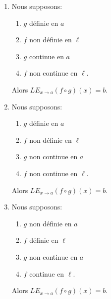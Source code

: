 \begin{theorem}
\begin{enumerate}
\begin{multicols}{2}
\begin{enumerate}
				      \item \( g\) non continue en \( a\)
				      \item \( f\) non continue en \( \ell\).
			      \end{enumerate}
		      \end{multicols}
		      Alors nous ne disons rien.
		\item   \label{ITEMooANFQooWVrfTd}      %
		      Nous supposons:
		      \begin{multicols}{2}
			      \begin{enumerate}
				      \item \( g\) définie en \( a\)
				      \item \( f\) non définie en \( \ell\)
				      \item \( g\) continue en \( a\)
				      \item \( f\) non continue en \( \ell\).
			      \end{enumerate}
		      \end{multicols}
		      Alors \( {LE}_{x\to a}(f\circ g)(x)=b\).
		\item   \label{ITEMooDJBHooSlqpOO}      %
		      Nous supposons:
		      \begin{multicols}{2}
			      \begin{enumerate}
				      \item \( g\) définie en \( a\)
				      \item \( f\) non définie en \( \ell\)
				      \item \( g\) non continue en \( a\)
				      \item \( f\) non continue en \( \ell\).
			      \end{enumerate}
		      \end{multicols}
		      Alors \( {LE}_{x\to a}(f\circ g)(x)=b\).
		\item   \label{ITEMooUFJHooRzLglZ}      %
		      Nous supposons:
		      \begin{multicols}{2}
			      \begin{enumerate}
				      \item \( g\) non définie en \( a\)
				      \item \( f\) définie en \( \ell\)
				      \item \( g\) non continue en \( a\)
				      \item \( f\) continue en \( \ell\).
			      \end{enumerate}
		      \end{multicols}
		      Alors \( {LE}_{x\to a}(f\circ g)(x)=b\).

\end{enumerate}
\end{theorem}
